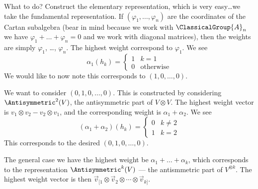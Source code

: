 What to do? Construct the elementary representation, which is
very easy\dots we take the fundamental representation. If
$(\varphi_{1},\dots,\varphi_{n})$ are the coordinates of the
Cartan subalgebra (bear in mind because we work with
$\ClassicalGroup{A}_{n}$ we have
$\varphi_{1}+\dots+\varphi_{n}=0$ and we work with diagonal
matrices), then the weights are simply $\varphi_{1}$, \dots,
$\varphi_{n}$. The highest weight correspond to $\varphi_{1}$. We
see
\begin{equation}
\alpha_{1}(h_{k}) = \begin{cases}1 & k=1\\
0 & \text{otherwise}
\end{cases}
\end{equation}
We would like to now note this corresponds to $(1,0,\dots,0)$.

We want to consider $(0,1,0,\dots,0)$. This is constructed by
considering $\Antisymmetric^{2}(V)$, the antisymmetric part of
$V\otimes V$. The highest weight vector is $v_{1}\otimes
v_{2}-v_{2}\otimes v_{1}$, and the corresponding weight is
$\alpha_{1}+\alpha_{2}$. We see
\begin{equation}
(\alpha_{1}+\alpha_{2})(h_{k})=\begin{cases}0 & k\not=2\\
1 & k=2
\end{cases}
\end{equation}
This corresponds to the desired $(0,1,0,\dots,0)$.

The general case we have the highest weight be
$\alpha_{1}+\dots+\alpha_{k}$, which corresponds to the
representation $\Antisymmetric^{k}(V)$ --- the antismmetric part
of $V^{\otimes k}$. The highest weight vector is then $\vec{v}_{[1}\otimes\vec{v}_{2}\otimes\cdots\otimes\vec{v}_{k]}$.
